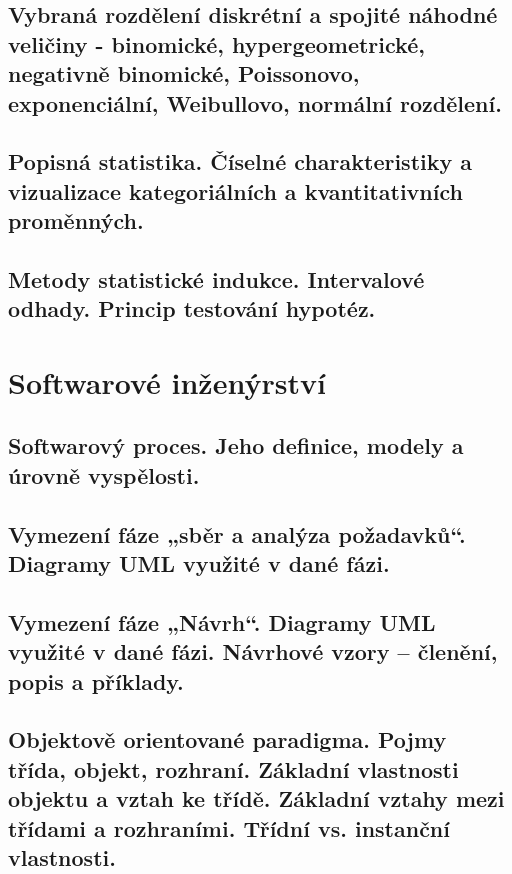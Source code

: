 \documentclass[twoside]{book}
\begin{document}
\chapter{Vybraná rozdělení diskrétní a spojité náhodné veličiny - binomické, hypergeometrické, negativně binomické, Poissonovo, exponenciální, Weibullovo, normální rozdělení.}

\clearpage

\chapter{Popisná statistika. Číselné charakteristiky a vizualizace kategoriálních a kvantitativních proměnných.}

\clearpage

\chapter{Metody statistické indukce. Intervalové odhady. Princip testování hypotéz.}

\clearpage

\part{Softwarové inženýrství}

\chapter{Softwarový proces. Jeho definice, modely a úrovně vyspělosti.}

\clearpage

\chapter{Vymezení fáze „sběr a analýza požadavků“. Diagramy UML využité v dané fázi.}

\clearpage

\chapter{Vymezení fáze „Návrh“. Diagramy UML využité v dané fázi. Návrhové vzory – členění, popis a příklady. }

\clearpage

\chapter{Objektově orientované paradigma. Pojmy třída, objekt, rozhraní. Základní vlastnosti objektu a vztah ke třídě. Základní vztahy mezi třídami a rozhraními. Třídní vs. instanční vlastnosti.}

\clearpage
\end{document}
